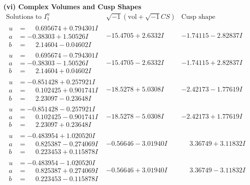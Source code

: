 \documentclass[1p]{elsarticle_modified}
\theoremstyle{definition}
\newcommand{\I}{\sqrt{-1}}
\begin{document}
\newpage\flushleft \textbf{(vi) Complex Volumes and Cusp Shapes}
$$\begin{array}{c|c|c}  
\text{Solutions to }I^u_{1}& \I (\text{vol} + \sqrt{-1}CS) & \text{Cusp shape}\\
 \hline 
\begin{aligned}
u &= \phantom{-}0.695674 + 0.794301 I \\
a &= -0.38303 + 1.50526 I \\
b &= \phantom{-}2.14604 - 0.04602 I\end{aligned}
 & -15.4705 + 2.6332 I & -1.74115 - 2.82837 I \\ \hline\begin{aligned}
u &= \phantom{-}0.695674 - 0.794301 I \\
a &= -0.38303 - 1.50526 I \\
b &= \phantom{-}2.14604 + 0.04602 I\end{aligned}
 & -15.4705 - 2.6332 I & -1.74115 + 2.82837 I \\ \hline\begin{aligned}
u &= -0.851428 + 0.257921 I \\
a &= \phantom{-}0.102425 + 0.901741 I \\
b &= \phantom{-}2.23097 - 0.23648 I\end{aligned}
 & -18.5278 + 5.0308 I & -2.42173 - 1.77619 I \\ \hline\begin{aligned}
u &= -0.851428 - 0.257921 I \\
a &= \phantom{-}0.102425 - 0.901741 I \\
b &= \phantom{-}2.23097 + 0.23648 I\end{aligned}
 & -18.5278 - 5.0308 I & -2.42173 + 1.77619 I \\ \hline\begin{aligned}
u &= -0.483954 + 1.020520 I \\
a &= \phantom{-}0.825387 - 0.274069 I \\
b &= \phantom{-}0.223453 + 0.115878 I\end{aligned}
 & -0.56646 - 3.01940 I & \phantom{-}3.36749 + 3.11832 I \\ \hline\begin{aligned}
u &= -0.483954 - 1.020520 I \\
a &= \phantom{-}0.825387 + 0.274069 I \\
b &= \phantom{-}0.223453 - 0.115878 I\end{aligned}
 & -0.56646 + 3.01940 I & \phantom{-}3.36749 - 3.11832 I \\ \hline\begin{aligned}

\end{aligned}
\end{array}$$
\end{document}
